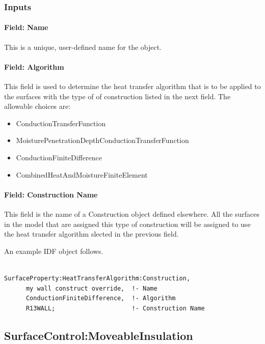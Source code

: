 \subsubsection{Inputs}\label{inputs-3}

\paragraph{Field: Name}\label{field-name-2}

This is a unique, user-defined name for the object.

\paragraph{Field: Algorithm}\label{field-algorithm-3}

This field is used to determine the heat transfer algorithm that is to be applied to the surfaces with the type of of construction listed in the next field. The allowable choices are:

\begin{itemize}
\item
  ConductionTransferFunction
\item
  MoisturePenetrationDepthConductionTransferFunction
\item
  ConductionFiniteDifference
\item
  CombinedHeatAndMoistureFiniteElement
\end{itemize}

\paragraph{Field: Construction Name}\label{field-construction-name}

This field is the name of a Construction object defined elsewhere. All the surfaces in the model that are assigned this type of construction will be assigned to use the heat transfer algorithm slected in the previous field.

An example IDF object follows.

\begin{lstlisting}

SurfaceProperty:HeatTransferAlgorithm:Construction,
      my wall construct override,  !- Name
      ConductionFiniteDifference,  !- Algorithm
      R13WALL;                     !- Construction Name
\end{lstlisting}

\subsection{SurfaceControl:MoveableInsulation}\label{surfacecontrolmoveableinsulation}


